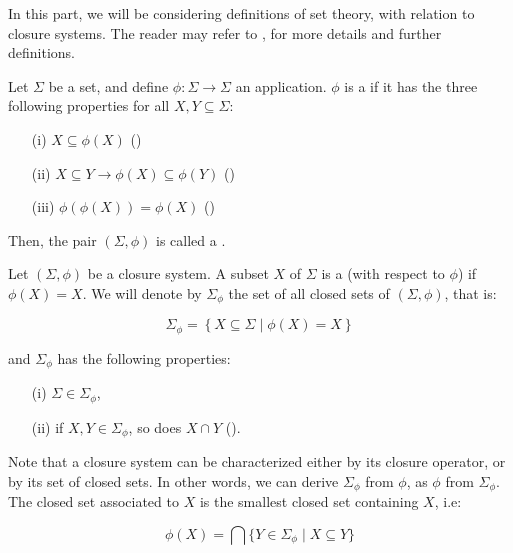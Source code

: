 \documentclass[a4paper]{report}
\begin{document}
In this part, we will be considering definitions of set theory, with relation to
closure systems. The reader may refer to \cite{CExp}, \cite{Lat&Ord} for more 
details and further definitions.

\begin{definition} Let
$\Sigma$ be a set, and define $\phi : \Sigma \longrightarrow \Sigma$ an
application. $\phi$ is a  if it has the three following
properties for all $X, Y \subseteq \Sigma$:
\begin{itemize}
	\item[(i)] $X \subseteq \phi(X)$ ()
	\item[(ii)] $X \subseteq Y \longrightarrow \phi(X) \subseteq \phi(Y)$ 
		()
	\item[(iii)] $\phi(\phi(X)) = \phi(X)$ ()
\end{itemize}

\noindent Then, the pair $(\Sigma, \phi)$ is called a .
	
\end{definition}


\begin{definition} Let $(\Sigma, \phi)$ be a closure 
system. A subset $X$ of $\Sigma$ is a  (with respect to 
$\phi$) if $\phi(X) = X$. We will denote by $\Sigma_{\phi}$ the set of all 
closed sets of $(\Sigma, \phi)$, that is:
	
	\[ \Sigma_{\phi} = \left\{ X \subseteq \Sigma \; | \; \phi(X) = X 
	\right\}  \]

\noindent and $\Sigma_{\phi}$ has the following properties:
\begin{itemize}
	\item[(i)] $\Sigma \in \Sigma_{\phi}$,
	\item[(ii)] if $X, Y \in \Sigma_{\phi}$, so does $X \cap Y$ 
		().
\end{itemize}
	
\end{definition}

\noindent Note that a closure system can be characterized either by its closure
operator, or by its set of closed sets. In other words, we can derive 
$\Sigma_{\phi}$ from $\phi$, as $\phi$ from $\Sigma_{\phi}$. The closed set 
associated to $X$ is the smallest closed set containing $X$, i.e:

	\[ \phi(X) = \bigcap \{Y \in \Sigma_\phi \; | \; X \subseteq Y \} \]
\end{document}
